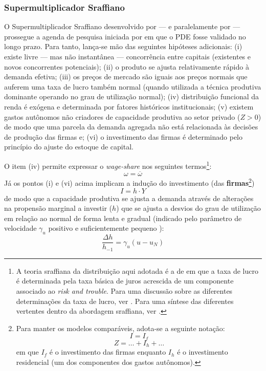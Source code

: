 \subsubsection{Supermultiplicador Sraffiano}\label{SecSuper}

O Supermultiplicador Sraffiano desenvolvido por \textcite{serrano_sraffian_1995} --- e paralelamente por \textcite{bortis_institutions_1996} --- prossegue a agenda de pesquisa iniciada por \textcite{garegnani_problem_2015} em que o PDE fosse validado no longo prazo. 
Para tanto, lança-se mão das seguintes hipóteses adicionais: 
	(i) existe livre --- mas não instantânea --- concorrência entre capitais (existentes e novos concorrentes potenciais);
	(ii) o produto se ajusta relativamente rápido à demanda efetiva;
	(iii) os preços de mercado são iguais aos preços normais que auferem uma taxa de lucro também normal (quando utilizada a técnica produtiva dominante operando no grau de utilização normal);
	(iv) distribuição funcional da renda é exógena e determinada por fatores históricos institucionais;
	(v) existem gastos autônomos não criadores de capacidade produtiva ao setor privado ($Z>0$) de modo que uma parcela da demanda agregada não está relacionada às decisões de produção das firmas e;
	(vi) o investimento das firmas é determinado pelo princípio do ajuste do estoque de capital.

O item (iv) permite expressar o \textit{wage-share} nos seguintes termos\footnote{
	A teoria sraffiana da distribuição aqui adotada é a de \textcite{pivetti_essay_1992} em que a taxa de lucro é determinada pela taxa básica de juros acrescida de um componente associado ao \textit{risk and trouble}.
	Para uma discussão sobre as diferentes determinações da taxa de lucro, ver \textcite{serrano_teoria_1988}.
	Para uma síntese das diferentes vertentes dentro da abordagem sraffiana, ver \textcite{aspromourgos_sraffian_2004}.
}:
$$
\omega = \overline \omega
$$
Já os pontos (i) e (vi) acima implicam a indução do investimento (das \textbf{firmas}\footnote{
	Para manter os modelos comparáveis, adota-se a seguinte notação:
	$$
	I = I_f
	$$
	$$
	Z = \ldots + I_h + \ldots
	$$
	em que $I_f$ é o investimento das firmas enquanto $I_h$ é o investimento residencial (um dos componentes dos gastos autônomos).
}) 
$$
I = h\cdot Y
$$
de modo que a capacidade produtiva se ajusta a demanda através de alterações na propensão marginal a investir ($h$) que se ajusta a desvios do grau de utilização em relação ao normal de forma lenta e gradual (indicado pelo parâmetro de velocidade $\gamma_u$ positivo e suficientemente pequeno \cite[p.~271]{freitas_growth_2015}):
$$
\frac{\Delta h}{h_{-1}} = \gamma_u (u - u_N)
$$

